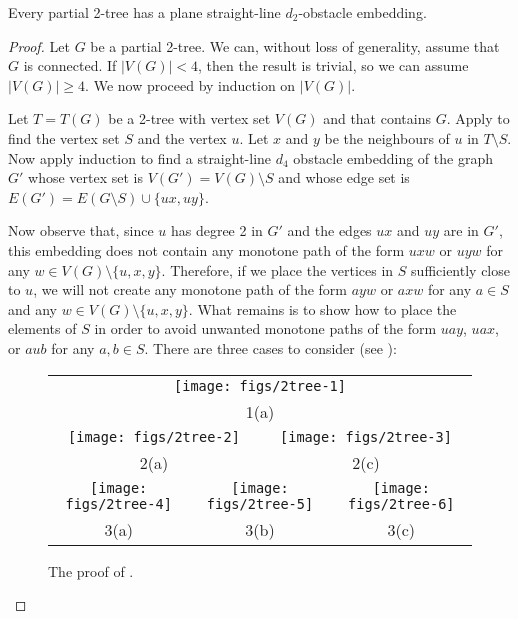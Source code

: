 \documentclass{patmorin}
\begin{document}
\begin{thm}
  Every partial 2-tree has a plane straight-line $d_2$-obstacle embedding.
\end{thm}

\begin{proof}
  Let $G$ be a partial 2-tree. We can, without loss of generality, assume
  that $G$ is connected.  If $|V(G)|< 4$, then the result is trivial, so
  we can assume $|V(G)|\ge 4$.  We now proceed by induction on $|V(G)|$.

  Let $T=T(G)$ be a 2-tree with vertex set $V(G)$ and that contains $G$.
  Apply  to find the vertex set $S$ and the vertex $u$.
  Let $x$ and $y$ be the neighbours of $u$ in $T\setminus S$. Now apply
  induction to find a straight-line $d_4$ obstacle embedding of the
  graph $G'$ whose vertex set is $V(G')=V(G)\setminus S$ and whose edge
  set is $E(G')=E(G\setminus S)\cup\{ux,uy\}$.

  Now observe that, since $u$ has degree 2 in $G'$ and the edges $ux$
  and $uy$ are in $G'$, this embedding does not contain any monotone path
  of the form $uxw$ or $uyw$ for any $w\in V(G)\setminus\{u,x,y\}$.
  Therefore, if we place the vertices in $S$ sufficiently close to $u$,
  we will not create any monotone path of the form $ayw$ or $axw$ for
  any $a\in S$ and any $w\in V(G)\setminus \{u,x,y\}$.  What remains
  is to show how to place the elements of $S$ in order to avoid unwanted
  monotone paths of the form $uay$, $uax$, or $aub$ for any $a,b\in S$.
  There are three cases to consider (see ):

  \begin{figure}
    \begin{tabular}{cccccc}
       \multicolumn{6}{c}{\texttt{[image: figs/2tree-1]}} \\
       \multicolumn{6}{c}{1(a)} \\
       \multicolumn{3}{c}{\texttt{[image: figs/2tree-2]}} & 
       \multicolumn{3}{c}{\texttt{[image: figs/2tree-3]}} \\
       \multicolumn{3}{c}{2(a)} &
       \multicolumn{3}{c}{2(c)} \\
       \multicolumn{2}{c}{\texttt{[image: figs/2tree-4]}} &
       \multicolumn{2}{c}{\texttt{[image: figs/2tree-5]}} &
       \multicolumn{2}{c}{\texttt{[image: figs/2tree-6]}} \\
       \multicolumn{2}{c}{3(a)} &
       \multicolumn{2}{c}{3(b)} &
       \multicolumn{2}{c}{3(c)} 
    \end{tabular}
  \caption{The proof of .}
  \end{figure}
  

\end{proof}
\end{document}
